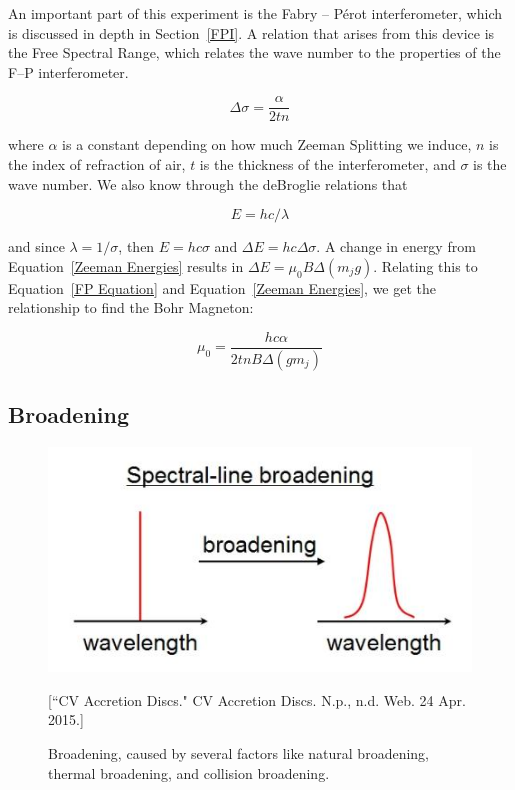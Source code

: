 An important part of this experiment is the Fabry -- P\'{e}rot interferometer, which is discussed in depth in Section~\ref{FPI}. A relation that arises from this device is the Free Spectral Range, which relates the wave number to the properties of the F--P interferometer. 

\begin{equation} 
  \Delta \sigma = \frac{\alpha}{2tn}
  \label{FP Equation}
\end{equation}

where $\alpha$ is a constant depending on how much Zeeman Splitting we induce, $n$ is the index of refraction of air, $t$ is the thickness of the interferometer, and $\sigma$ is the wave number. We also know through the deBroglie relations that 

\begin{equation}
  E = hc/\lambda 
  \label{deBroglie}
\end{equation}

and since $\lambda = 1 / \sigma$, then $E = hc\sigma$ and $\Delta E = hc \Delta \sigma$. A change in energy from Equation~\ref{Zeeman Energies} results in $\Delta E = \mu_0 B \Delta (m_j g)$. Relating this to Equation~\ref{FP Equation} and Equation~\ref{Zeeman Energies}, we get the relationship to find the Bohr Magneton:

\begin{equation}
  \mu_0 = \frac{h c \alpha}{2 t n B \Delta(g m_j)}
  \label{Bohr Magneton}
\end{equation}

\subsection{Broadening}

\begin{figure}[t]
  \includegraphics[width = 5 cm]{Broadening.jpg}
  \begin{center}
  \caption{Broadening, caused by several factors like natural broadening, thermal broadening, and collision broadening.}[\footnotesize{``CV Accretion Discs." CV Accretion Discs. N.p., n.d. Web. 24 Apr. 2015.}]
  \label{Broadening}
  \end{center}
\end{figure}

